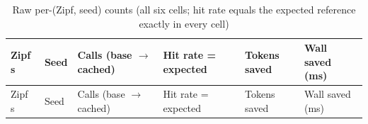\documentclass[
  11pt,
]{article}
\begin{document}
\begin{longtable}[]{@{}
  >{\raggedright\arraybackslash}p{}
  >{\raggedright\arraybackslash}p{}
  >{\raggedright\arraybackslash}p{}
  >{\raggedright\arraybackslash}p{}
  >{\raggedright\arraybackslash}p{}
  >{\raggedright\arraybackslash}p{}@{}}
\caption{Raw per-(Zipf, seed) counts (all six cells; hit rate equals the
expected reference exactly in every cell)}\tabularnewline
\toprule\noalign{}
\begin{minipage}[b]{\linewidth}\raggedright
Zipf s
\end{minipage} & \begin{minipage}[b]{\linewidth}\raggedright
Seed
\end{minipage} & \begin{minipage}[b]{\linewidth}\raggedright
Calls (base \(\rightarrow\) cached)
\end{minipage} & \begin{minipage}[b]{\linewidth}\raggedright
Hit rate = expected
\end{minipage} & \begin{minipage}[b]{\linewidth}\raggedright
Tokens saved
\end{minipage} & \begin{minipage}[b]{\linewidth}\raggedright
Wall saved (ms)
\end{minipage} \\
\midrule\noalign{}
\endfirsthead
\toprule\noalign{}
\begin{minipage}[b]{\linewidth}\raggedright
Zipf s
\end{minipage} & \begin{minipage}[b]{\linewidth}\raggedright
Seed
\end{minipage} & \begin{minipage}[b]{\linewidth}\raggedright
Calls (base \(\rightarrow\) cached)
\end{minipage} & \begin{minipage}[b]{\linewidth}\raggedright
Hit rate = expected
\end{minipage} & \begin{minipage}[b]{\linewidth}\raggedright
Tokens saved
\end{minipage} & \begin{minipage}[b]{\linewidth}\raggedright
Wall saved (ms)

\end{minipage}
\end{longtable}
\end{document}
